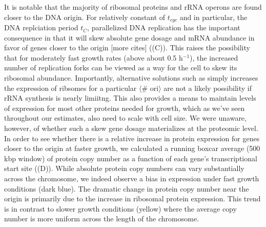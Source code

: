 It is notable that the majority of ribosomal proteins and rRNA operons are found
closer to the DNA origin. For relatively constant of $t_{cyc}$ and in
particular, the DNA replciation period $t_C$, parallelized DNA replication has
the important consequence in that it will skew absolute gene dosage and mRNA
abundance in favor of genes closer to the origin \citep{scholz2019} [more cites]
((C)). This raises the possibility that for
moderately fast growth rates (above about 0.5 h$^{-1}$), the increased number of
replication forks can be viewed as a way for the cell to skew its ribosomal
abundance. Importantly, alternative solutions such as simply increases the
expression of ribsomes for a particular $\langle$\# ori$\rangle$ are not a
likely possibility if rRNA synthesis is nearly limiitng. This also provides a
means to maintain levels of expression for most other proteins needed  for
growth, which as we've seen throughout our estimates, also need to scale with
cell size. We were unaware, however, of whether such a skew gene dosage
materializes at the proteomic level. In order to see whether there is a relative
increase in protein expression for genes closer to the origin at faster growth,
we calculated a running boxcar average (500 kbp window) of protein copy number
as a function of each gene's transcriptional start site
((D)). While absolute protein copy numbers can vary
substantially across the chromosome, we indeed observe a bias in expression
under fast growth conditions (dark blue). The dramatic change in protein copy
number near the origin is primarily due to the increase in ribosomal protein
expression. This trend is in contrast to slower growth conditions (yellow) where
the average copy number is more uniform across the length of the chromosome.

